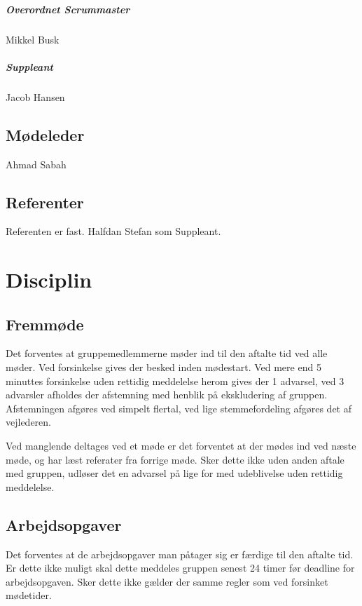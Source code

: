 \documentclass[a4paper,article,11pt,oneside]{memoir}
\begin{document}
\paragraph*{Overordnet Scrummaster} Mikkel Busk
\paragraph*{Suppleant} Jacob Hansen
\section{Mødeleder}
Ahmad Sabah
\section{Referenter}
Referenten er fast.
Halfdan 
Stefan som Suppleant.
\chapter{Disciplin}
\section{Fremmøde}
Det forventes at gruppemedlemmerne møder ind til den aftalte tid ved alle møder.
Ved forsinkelse gives der besked inden mødestart.  Ved mere end  5 minuttes forsinkelse uden rettidig meddelelse herom gives der 1 advarsel, ved 3 advarsler afholdes der afstemning med henblik på ekskludering af gruppen. Afstemningen afgøres ved simpelt flertal, ved lige stemmefordeling afgøres det af vejlederen.

Ved manglende deltages ved et møde er det forventet at der mødes ind ved næste møde, og har læst referater fra forrige møde. Sker dette ikke uden anden aftale med gruppen, udløser det en advarsel på lige for med udeblivelse uden rettidig meddelelse.

\section{Arbejdsopgaver}
Det forventes at de arbejdsopgaver man påtager sig er færdige til den aftalte tid. Er dette ikke muligt skal dette meddeles gruppen senest 24 timer før deadline for arbejdsopgaven. Sker dette ikke gælder der samme regler som ved forsinket mødetider.



\end{document}
